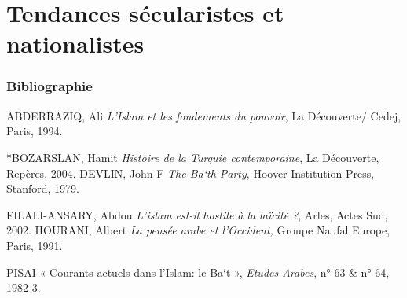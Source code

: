 
\chapter{{Tendances sécularistes et nationalistes}}
 
 \subsection{Bibliographie}
 
  ABDERRAZIQ, Ali \emph{L'Islam et les fondements du pouvoir}, La
  Découverte/ Cedej, Paris, 1994.
 
*BOZARSLAN, Hamit \emph{Histoire de la Turquie contemporaine}, La
Découverte, Repères, 2004. DEVLIN, John F \emph{The Ba`th Party}, Hoover
Institution Press, Stanford, 1979.

FILALI-ANSARY, Abdou \emph{L'islam est-il hostile à la laïcité ?},
Arles, Actes Sud, 2002. HOURANI, Albert \emph{La pensée arabe et
l'Occident,} Groupe Naufal Europe, Paris, 1991.

PISAI « Courants actuels dans l'Islam: le Ba`t », \emph{Etudes Arabes},
n° 63 \& n° 64, 1982-3.
 


